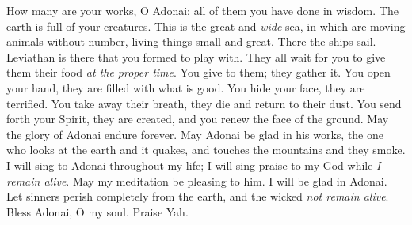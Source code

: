 \begin{biblechapter}
\verse How many are your works, O Adonai; 
all of them you have done in wisdom. 
The earth is full of your creatures.
\verse This is the great and \textit{wide} sea, 
in which are moving animals without number, 
living things small and great.
\verse There the ships sail. 
Leviathan is there that you formed to play with.
\verse They all wait for you 
to give them their food \textit{at the proper time}.
\verse You give to them; they gather it. 
You open your hand, they are filled with what is good.
\verse You hide your face, they are terrified. 
You take away their breath, they die 
and return to their dust.
\verse You send forth your Spirit, they are created, 
and you renew the face of the ground.
\verse May the glory of Adonai endure forever. 
May Adonai be glad in his works,
\verse the one who looks at the earth and it quakes, 
and touches the mountains and they smoke.
\verse I will sing to Adonai throughout my life; 
I will sing praise to my God while \textit{I remain alive}.
\verse May my meditation be pleasing to him. 
I will be glad in Adonai.
\verse Let sinners perish completely from the earth, 
and the wicked \textit{not remain alive}. 
Bless Adonai, O my soul. 
Praise Yah.
\end{biblechapter}

